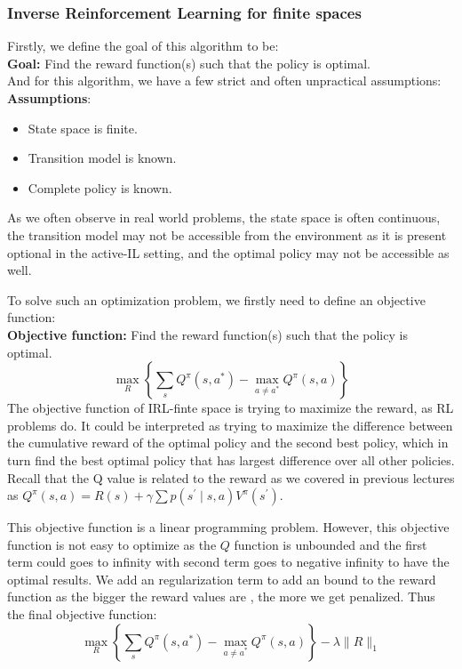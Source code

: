 \documentclass[11pt]{article}
\begin{document}
\subsubsection{Inverse Reinforcement Learning for finite spaces}
Firstly, we define the goal of this algorithm to be: \\
\textbf{Goal:} Find the reward function(s) such that the policy is optimal.\\ 
And for this algorithm, we have a few strict and often unpractical assumptions: \\
\textbf{Assumptions}:
\begin{itemize}
    \item State space is finite.
    \item Transition model is known.
    \item Complete policy is known.
\end{itemize}
As we often observe in real world problems, the state space is often continuous, the transition model may not be accessible from the environment as it is present optional in the active-IL setting, and the optimal policy may not be accessible as well. 

To solve such an optimization problem, we firstly need to define an objective function: \\
\textbf{Objective function:} Find the reward function(s) such that the policy is optimal.\\ 
$$
\max _{R}\left\{\sum_{s} Q^{\pi}\left(s, a^{*}\right)-\max _{a \neq a^{*}} Q^{\pi}(s, a)\right\}
$$
The objective function of IRL-finte space is trying to maximize the reward, as RL problems do.
It could be interpreted as trying to maximize the difference between the cumulative reward of the optimal policy and the second best policy, which in turn find the best optimal policy that has largest difference over all other policies. Recall that the Q value is related to the reward as we covered in previous lectures as $Q^{\pi}(s, a)=R(s)+\gamma \sum p\left(s^{\prime} \mid s, a\right) V^{\pi}\left(s^{\prime}\right)$.

This objective function is a linear programming problem. However, this objective function is not easy to optimize as the $Q$ function is unbounded and the first term could goes to infinity with second term goes to negative infinity to have the optimal results. We add an regularization term to add an bound to the reward function as the bigger the reward values are , the more we get penalized. Thus the final objective function:
$$
\max _{R}\left\{\sum_{s} Q^{\pi}\left(s, a^{*}\right)-\max _{a \neq a^{*}} Q^{\pi}(s, a)\right\}-\lambda\|R\|_{1}
$$
\end{document}
